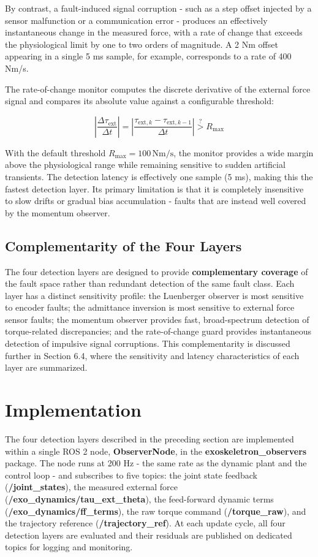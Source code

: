 By contrast, a fault-induced signal corruption - such as a step offset injected by a sensor malfunction or a communication error - produces an effectively instantaneous change in the measured force, with a rate of change that exceeds the physiological limit by one to two orders of magnitude. A 2 Nm offset appearing in a single 5 ms sample, for example, corresponds to a rate of 400 Nm/s.
 
The rate-of-change monitor computes the discrete derivative of the external force signal and compares its absolute value against a configurable threshold:

\begin{equation}
    \left| \frac{\Delta \tau_{\text{ext}}}{\Delta t} \right| = \left| \frac{\tau_{\text{ext},k} - \tau_{\text{ext},k-1}}{\Delta t} \right| \stackrel{?}{>} R_{\text{max}}
\end{equation}

With the default threshold $R_{\text{max}} = 100\,\text{Nm/s}$, the monitor provides a wide margin above the physiological range while remaining sensitive to sudden artificial transients. The detection latency is effectively one sample (5 ms), making this the fastest detection layer. Its primary limitation is that it is completely insensitive to slow drifts or gradual bias accumulation - faults that are instead well covered by the momentum observer.

\subsection{Complementarity of the Four Layers}
The four detection layers are designed to provide \textbf{complementary coverage} of the fault space rather than redundant detection of the same fault class. Each layer has a distinct sensitivity profile: the Luenberger observer is most sensitive to encoder faults; the admittance inversion is most sensitive to external force sensor faults; the momentum observer provides fast, broad-spectrum detection of torque-related discrepancies; and the rate-of-change guard provides instantaneous detection of impulsive signal corruptions. This complementarity is discussed further in Section 6.4, where the sensitivity and latency characteristics of each layer are summarized.


\section{Implementation}
The four detection layers described in the preceding section are implemented within a single ROS 2 node, \textbf{ObserverNode}, in the \textbf{exoskeletron\_observers} package. The node runs at 200 Hz - the same rate as the dynamic plant and the control loop - and subscribes to five topics: the joint state feedback (\textbf{/joint\_states}), the measured external force (\textbf{/exo\_dynamics/tau\_ext\_theta}), the feed-forward dynamic terms (\textbf{/exo\_dynamics/ff\_terms}), the raw torque command \newline(\textbf{/torque\_raw}), and the trajectory reference (\textbf{/trajectory\_ref}). At each update cycle, all four detection layers are evaluated and their residuals are published on dedicated topics for logging and monitoring.


